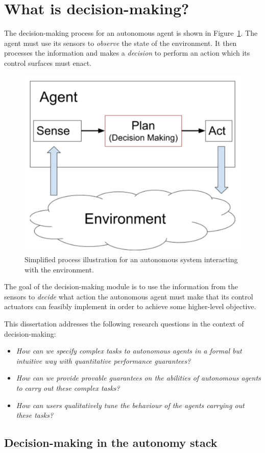 \section{What is decision-making?}

The decision-making process for an autonomous agent is shown in Figure~\ref{fig:decisionloop}. The agent must use its sensors to \emph{observe} the state of the environment. It then processes the information and makes a \emph{decision} to perform an action which its control surfaces must enact.
\begin{figure}
	\centering
	\includegraphics[width=0.5\linewidth]{Introduction/Figs/decisionloop}
	\caption{Simplified process illustration for an autonomous system interacting with the environment.}\label{fig:decisionloop}
\end{figure}


The goal of the decision-making module is to use the information from the sensors to \emph{decide} what action the autonomous agent must make that its control actuators can feasibly implement in order to achieve some higher-level objective. 

This dissertation addresses the following research questions in the context of decision-making:

\begin{itemize}
	\item \emph{How can we specify complex tasks to autonomous agents in a formal but intuitive way with quantitative performance guarantees?}
	\item \emph{How can we provide provable guarantees on the abilities of autonomous agents to carry out these complex tasks?}
	\item \emph{How can users qualitatively tune the behaviour of the agents carrying out these tasks?}
\end{itemize}


\subsection{Decision-making in the autonomy stack}


